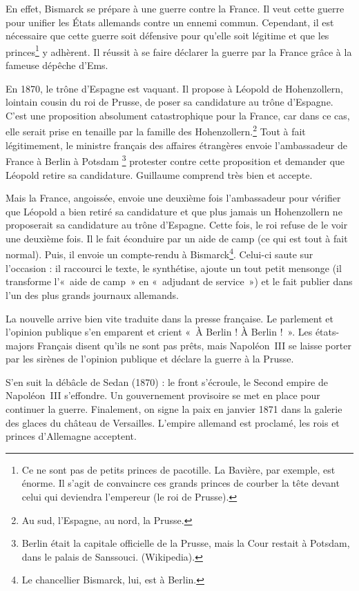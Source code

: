 \documentclass[12pt]{report}
\begin{document}
En effet, Bismarck se prépare à une guerre contre la France.
Il veut cette guerre pour unifier les États allemands contre un ennemi commun.
Cependant, il est nécessaire que cette guerre soit défensive pour qu'elle soit légitime et que les princes\footnote{Ce ne sont pas de petits princes de pacotille. La Bavière, par exemple, est énorme. Il s'agit de convaincre ces grands princes de courber la tête devant celui qui deviendra l'empereur (le roi de Prusse).} y adhèrent.
Il réussit à se faire déclarer la guerre par la France grâce à la fameuse dépêche d’Ems.

En 1870, le trône d’Espagne est vaquant.
Il propose à Léopold de Hohenzollern, lointain cousin du roi de Prusse, de poser sa candidature au trône d'Espagne.
C’est une proposition absolument catastrophique pour la France, car dans ce cas, elle serait prise en tenaille par la famille des Hohenzollern.\footnote{Au sud, l'Espagne, au nord, la Prusse.}
Tout à fait légitimement, le ministre français des affaires étrangères envoie l'ambassadeur de France à Berlin à Potsdam \footnote{Berlin était la capitale officielle de la Prusse, mais la Cour restait à Potsdam, dans le palais de Sanssouci. (Wikipedia).} protester contre cette proposition et demander que Léopold retire sa candidature.
Guillaume comprend très bien et accepte.

Mais la France, angoissée, envoie une deuxième fois l’ambassadeur pour vérifier que Léopold a bien retiré sa candidature et que plus jamais un Hohenzollern ne proposerait sa candidature au trône d'Espagne.
Cette fois, le roi refuse de le voir une deuxième fois.
Il le fait éconduire par un aide de camp (ce qui est tout à fait normal).
Puis, il envoie un compte-rendu à Bismarck\footnote{Le chancellier Bismarck, lui, est à Berlin.}.
Celui-ci saute sur l'occasion : il raccourci le texte, le synthétise, ajoute un tout petit mensonge (il transforme l'«~aide de camp~» en «~adjudant de service~») et le fait publier dans l'un des plus grands journaux allemands.

La nouvelle arrive bien vite traduite dans la presse française.
Le parlement et l'opinion publique s'en emparent et crient «~À Berlin ! À Berlin !~».
Les états-majors Français disent qu'ils ne sont pas prêts, mais Napoléon~III se laisse porter par les sirènes de l'opinion publique et déclare la guerre à la Prusse.

S’en suit la débâcle de Sedan (1870) : le front s'écroule, le Second empire de Napoléon~III s'effondre.
Un gouvernement provisoire se met en place pour continuer la guerre.
Finalement, on signe la paix en janvier 1871 dans la galerie des glaces du château de Versailles.
L'empire allemand est proclamé, les rois et princes d'Allemagne acceptent.
\end{document}
